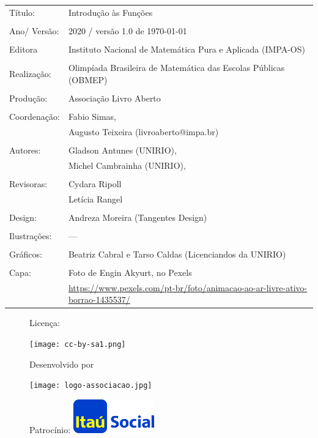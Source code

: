 \begin{tabular}{p{}p{}}
Título: & Introdução às Funções\\
\\
Ano/ Versão: & 2020 / versão 1.0 de \today\\
\\
Editora & Instituto Nacional de Matem\'atica Pura e Aplicada (IMPA-OS)\\
\\
Realização:& Olimp\'iada Brasileira de Matem\'atica das Escolas P\'ublicas (OBMEP)\\
\\
Produção:& Associação Livro Aberto\\
\\
Coordenação:& Fabio Simas, \\
			& Augusto Teixeira (livroaberto@impa.br)\\
\\
  Autores: & Gladson Antunes (UNIRIO),\\
        & Michel Cambrainha (UNIRIO),\\
           
\\
Revisoras: &  Cydara Ripoll  \\
                &  Letícia Rangel \\
\\
Design: & Andreza Moreira (Tangentes Design) \\
\\
  Ilustrações: & --- \\ 
\\
Gráficos: & Beatriz Cabral e Tarso Caldas (Licenciandos da UNIRIO)\\
\\
  Capa: & Foto de Engin Akyurt, no Pexels \\
  		& \url{https://www.pexels.com/pt-br/foto/animacao-ao-ar-livre-ativo-borrao-1435537/}
\end{tabular}
\vspace{.5cm}


\begin{figure}[b]
\begin{minipage}[l]{5cm}
\centering

{\large Licença:}

  \texttt{[image: cc-by-sa1.png]}
\end{minipage}\hfill
\begin{minipage}[c]{5cm}
\centering
{\large Desenvolvido por}

\texttt{[image: logo-associacao.jpg]}
\end{minipage}
\begin{minipage}[r]{5cm}
\centering

{\large Patrocínio:}
  \vspace{1em}
  \includegraphics[width=3.5cm]{itau}
\end{minipage}
\end{figure}

